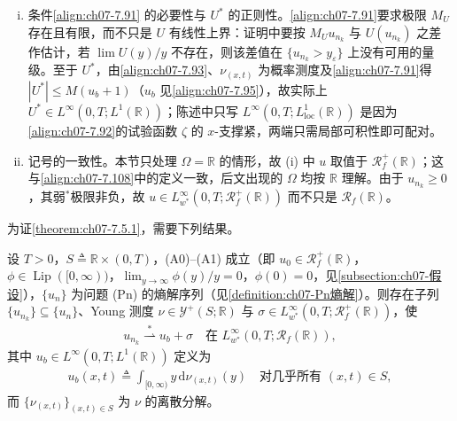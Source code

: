 \documentclass[../../main.tex]{subfiles}%
\begin{document}
\begin{remark}
\begin{enumerate}[(i)]
\item 条件\eqref{align:ch07-7.91} 的必要性与 $U^*$ 的正则性。\eqref{align:ch07-7.91}要求极限 $M_U$ 存在且有限，而不只是 $U$ 有线性上界：证明中要按 $M_Uu_{n_k}$ 与 $U(u_{n_k})$ 之差作估计，若 $\lim U(y)/y$ 不存在，则该差值在 $\{u_{n_k}>y_\varepsilon\}$ 上没有可用的量级。至于 $U^*$，由\eqref{align:ch07-7.93}、$\nu_{(x,t)}$ 为概率测度及\eqref{align:ch07-7.91}得 $|U^*|\leqslant M(u_b+1)$（$u_b$ 见\eqref{align:ch07-7.95}），故实际上 $U^*\in L^\infty(0,T;L^1(\mathbb{R}))$；陈述中只写 $L^\infty(0,T;L^1_{\mathrm{loc}}(\mathbb{R}))$ 是因为\eqref{align:ch07-7.92}的试验函数 $\zeta$ 的 $x$-支撑紧，两端只需局部可积性即可配对。
\item 记号的一致性。本节只处理 $\Omega=\mathbb{R}$ 的情形，故 (i) 中 $u$ 取值于 $\mathscr{R}_f^+(\mathbb{R})$；这与\eqref{align:ch07-7.108}中的定义一致，后文出现的 $\Omega$ 均按 $\mathbb{R}$ 理解。由于 $u_{n_k}\geqslant0$，其弱$^*$极限非负，故 $u\in L^\infty_{w^*}(0,T;\mathscr{R}_f^+(\mathbb{R}))$ 而不只是 $\mathscr{R}_f(\mathbb{R})$。
\end{enumerate}
\end{remark}

为证\cref{theorem:ch07-7.5.1}，需要下列结果。

\begin{proposition}\label{proposition:ch07-7.5.2}
设 $T>0$，$S\triangleq\mathbb{R}\times(0,T)$，(A0)--(A1) 成立（即 $u_0\in\mathscr{R}_f^+(\mathbb{R})$，$\phi\in\operatorname{Lip}([0,\infty))$，$\lim_{y\to\infty}\phi(y)/y=0$，$\phi(0)=0$，见\cref{subsection:ch07-假设}），$\{u_n\}$ 为问题 (Pn) 的熵解序列（见\cref{definition:ch07-Pn熵解}）。则存在子列 $\{u_{n_k}\}\subseteq\{u_n\}$、Young 测度 $\nu\in\mathcal{Y}^+(S;\mathbb{R})$ 与 $\sigma\in L^\infty_{w^*}(0,T;\mathscr{R}_f^+(\mathbb{R}))$，使
\begin{align}
u_{n_k}\stackrel{*}{\rightharpoonup}u_b+\sigma\quad\text{在 }L^\infty_{w^*}(0,T;\mathscr{R}_f(\mathbb{R})), \label{align:ch07-7.94}
\end{align}
其中 $u_b\in L^\infty(0,T;L^1(\mathbb{R}))$ 定义为
\begin{align}
u_b(x,t)\triangleq \int_{[0,\infty)}y\,\mathrm{d}\nu_{(x,t)}(y)
\quad\text{对几乎所有 }(x,t)\in S, \label{align:ch07-7.95}
\end{align}
而 $\{\nu_{(x,t)}\}_{(x,t)\in S}$ 为 $\nu$ 的离散分解。
\end{proposition}
\end{document}
